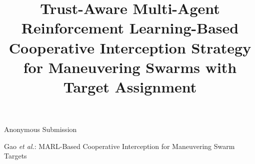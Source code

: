 \documentclass[lettersize,journal]{IEEEtran}
\begin{document}

\title{Trust-Aware Multi-Agent Reinforcement Learning-Based Cooperative Interception Strategy for Maneuvering Swarms with Target Assignment}


\author{}
%
{Anonymous Submission}

%
{Gao \MakeLowercase{\textit{et al.}}: MARL-Based Cooperative Interception for Maneuvering Swarm Targets}

\maketitle
\end{document}
